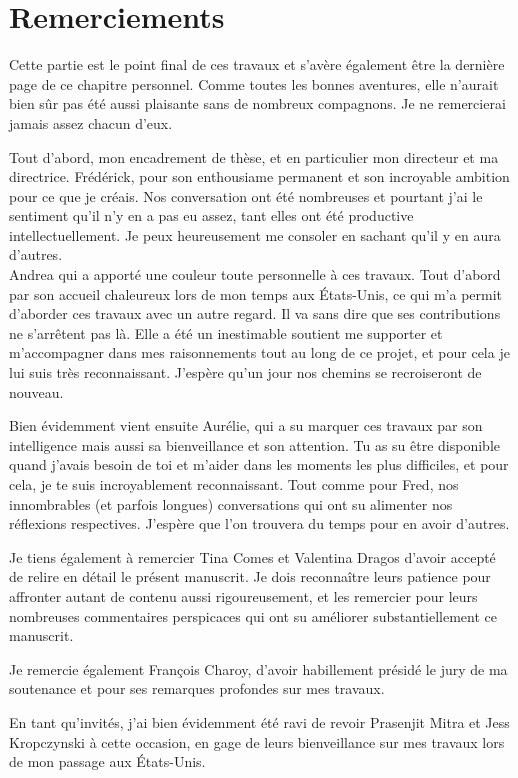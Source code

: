 \chapter*{Remerciements}

Cette partie est le point final de ces travaux et s'avère également être la dernière page de ce chapitre personnel.
Comme toutes les bonnes aventures, elle n'aurait bien sûr pas été aussi plaisante sans de nombreux compagnons.
Je ne remercierai jamais assez chacun d'eux.

Tout d'abord, mon encadrement de thèse, et en particulier mon directeur et ma directrice.
Frédérick, pour son enthousiame permanent et son incroyable ambition pour ce que je créais.
Nos conversation ont été nombreuses et pourtant j'ai le sentiment qu'il n'y en a pas eu assez,
tant elles ont été productive intellectuellement.
Je peux heureusement me consoler en sachant qu'il y en aura d'autres.\\
Andrea qui a apporté une couleur toute personnelle à ces travaux.
Tout d'abord par son accueil chaleureux lors de mon temps aux États-Unis, ce qui m'a permit d'aborder ces travaux avec un autre regard.
Il va sans dire que ses contributions ne s'arrêtent pas là.
Elle a été un inestimable soutient me supporter et m'accompagner dans mes raisonnements tout au long de ce projet, et pour cela je lui suis très reconnaissant.
J'espère qu'un jour nos chemins se recroiseront de nouveau.

Bien évidemment vient ensuite Aurélie, qui a su marquer ces travaux par son intelligence
mais aussi sa bienveillance et son attention. Tu as su être disponible quand j'avais besoin
de toi et m'aider dans les moments les plus difficiles, et pour cela, je te suis incroyablement reconnaissant.
Tout comme pour Fred, nos innombrables (et parfois longues) conversations qui ont su alimenter nos réflexions respectives.
J'espère que l'on trouvera du temps pour en avoir d'autres.

Je tiens également à remercier Tina Comes et Valentina Dragos d'avoir accepté de relire en détail le présent manuscrit.
Je dois reconnaître leurs patience pour affronter autant de contenu aussi rigoureusement, et les remercier pour leurs nombreuses commentaires perspicaces qui ont su améliorer substantiellement ce manuscrit.

Je remercie également François Charoy, d'avoir habillement présidé le jury de ma soutenance et pour ses remarques profondes sur mes travaux.

En tant qu'invités, j'ai bien évidemment été ravi de revoir Prasenjit Mitra et Jess Kropczynski à cette occasion, en gage de leurs bienveillance sur mes travaux lors de mon passage aux États-Unis.

